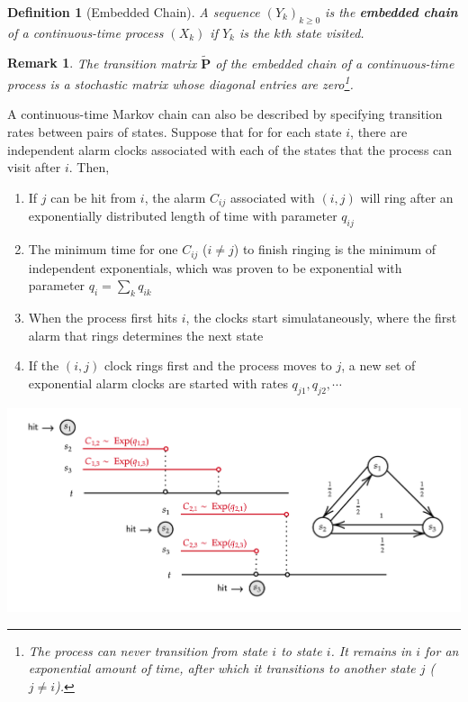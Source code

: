 \documentclass{tufte-handout}
\newtheorem{defn}[thm]{Definition}
\newtheorem{rmk}[thm]{Remark}
\begin{document}
\begin{defn}[Embedded Chain]
  A sequence $(Y_k)_{k \geq 0}$ is the \textbf{embedded chain} of a continuous-time process $(X_k)$ if $Y_k$ is the $k$th state visited.
\end{defn}

\begin{rmk}
  The transition matrix $\tilde{\mathbf{P}}$ of the embedded chain of a continuous-time process is a stochastic matrix whose diagonal entries are zero\footnote{The process can never transition from state $i$ to state $i$. It remains in $i$ for an exponential amount of time, after which it transitions to another state $j$ ($j \neq i$).}.
\end{rmk}

A continuous-time Markov chain can also be described by specifying transition rates between pairs of states. Suppose that for for each state $i$, there are independent alarm clocks associated with each of the states that the process can visit after $i$. Then,
\begin{enumerate}
  \item If $j$ can be hit from $i$, the alarm $C_{ij}$ associated with $(i,j)$ will ring after an exponentially distributed length of time with parameter $q_{ij}$

  \item The minimum time for one $C_{ij}$ ($i \neq j$) to finish ringing is the minimum of independent exponentials, which was proven to be exponential with parameter $q_i = \sum_k q_{ik}$

  \item When the process first hits $i$, the clocks start simulataneously, where the first alarm that rings determines the next state

  \item If the $(i,j)$ clock rings first and the process moves to $j$, a new set of exponential alarm clocks are started with rates $q_{j1}, q_{j2}, \cdots$

\end{enumerate}

\includegraphics[width=\textwidth]{fig-24.png}
\end{document}
